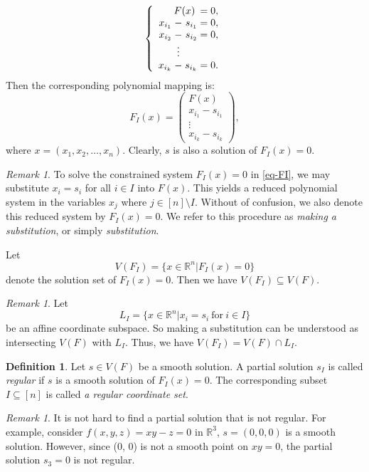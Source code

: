 \documentclass[reqno]{amsart}
\theoremstyle{definition}
\newtheorem{definition}[theorem]{Definition}
\numberwithin{equation}{section}
\theoremstyle{remark}
\newtheorem{remark}[theorem]{Remark}
\begin{document}
\begin{equation}\label{eq-FI}
\left\{
\begin{array}{r@{\;}c@{\;}r@{\;}c@{\;}l}
\multicolumn{3}{r}{F(x)} & = & 0,\\
x_{i_1} & - & s_{i_1} & = & 0,\\
x_{i_2} & - & s_{i_2} & = & 0,\\
        & \vdots &     &   &   \\
x_{i_k} & - & s_{i_k} & = & 0.
\end{array}
\right.
\end{equation}
Then the corresponding polynomial mapping is:
$$F_I(x)=
\left(
\begin{array}{c}
F(x)\\
x_{i_1}-s_{i_1}\\
\vdots\\
x_{i_k}-s_{i_k}
\end{array}
\right),
$$
where $x=(x_1,x_2,\ldots,x_n)$.
Clearly, $s$ is also a solution of $F_I(x)=0$.

\begin{remark}
To solve the constrained system $F_I(x)=0$ in \eqref{eq-FI}, we
may substitute $x_i=s_i$ for all $i\in I$ into $F(x)$. This yields
a reduced polynomial system in the variables $x_j$ where $j\in[n]\setminus I$. Without of confusion, we also denote this reduced system by
$F_I(x)=0$. We refer to this procedure as \emph{making a
substitution}, or simply \emph{substitution}.
\end{remark}

Let 
\begin{equation}\label{eq-VFI}
V(F_I)=\{x\in \mathbb{R}^n|F_I(x)=0\}
\end{equation}
denote the solution set of $F_I(x)=0$. Then we have $V(F_I)\subseteq V(F)$. 

\begin{remark}
Let 
$$L_I=\{x\in \mathbb{R}^n|x_i=s_i~\text{for}~i\in I\}$$
be an affine coordinate subspace. 
So making a substitution can be understood as intersecting $V(F)$ with $L_I$. Thus, we have $V(F_I)=V(F)\cap L_I$.
\end{remark}

\begin{definition}
Let  $s\in V(F)$ be a smooth solution. A partial solution $s_I$ is called 
\emph{regular} if $s$ is a smooth solution of $F_I(x)=0$. The corresponding subset $I\subseteq [n]$ is called \emph{a regular coordinate set}.
\end{definition}
\begin{remark}
It is not hard to find a partial solution that is not regular. For example,
consider $f(x,y,z)=xy-z=0$ in $\mathbb{R}^3$, $s=(0,0,0)$ is a smooth solution. However, since (0, 0) is not a smooth point on $xy=0$, the partial solution $s_3=0$ is not regular.
\end{remark}
\end{document}

